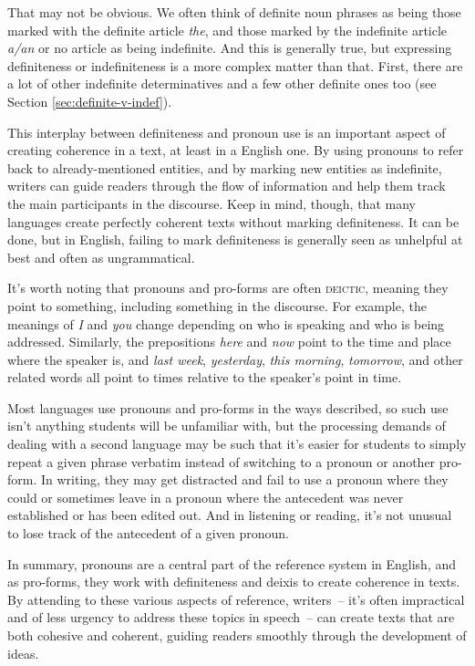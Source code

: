 That may not be obvious. We often think of definite noun phrases as being those marked with the definite article \textit{the}, and those marked by the indefinite article \textit{a/an} or no article as being indefinite. And this is generally true, but expressing definiteness or indefiniteness is a more complex matter than that. First, there are a lot of other indefinite determinatives and a few other definite ones too (see Section \ref{sec:definite-v-indef}).

This interplay between definiteness and pronoun use is an important aspect of creating coherence in a text, at least in a English one. By using pronouns to refer back to already-mentioned entities, and by marking new entities as indefinite, writers can guide readers through the flow of information and help them track the main participants in the discourse. Keep in mind, though, that many languages create perfectly coherent texts without marking definiteness. It can be done, but in English, failing to mark definiteness is generally seen as unhelpful at best and often as ungrammatical.

It's worth noting that pronouns and pro-forms are often \textsc{deictic}, meaning they point to something, including something in the discourse. For example, the meanings of \textit{I} and \textit{you} change depending on who is speaking and who is being addressed. Similarly, the prepositions \textit{here} and \textit{now} point to the time and place where the speaker is, and \textit{last week}, \textit{yesterday}, \textit{this morning}, \textit{tomorrow}, and other related words all point to times relative to the speaker's point in time.

Most languages use pronouns and pro-forms in the ways described, so such use isn't anything students will be unfamiliar with, but the processing demands of dealing with a second language may be such that it's easier for students to simply repeat a given phrase verbatim instead of switching to a pronoun or another pro-form. In writing, they may get distracted and fail to use a pronoun where they could or sometimes leave in a pronoun where the antecedent was never established or has been edited out. And in listening or reading, it's not unusual to lose track of the antecedent of a given pronoun.

In summary, pronouns are a central part of the reference system in English, and as pro-forms, they work with definiteness and deixis to create coherence in texts. By attending to these various aspects of reference, writers~-- it's often impractical and of less urgency to address these topics in speech~-- can create texts that are both cohesive and coherent, guiding readers smoothly through the development of ideas.

